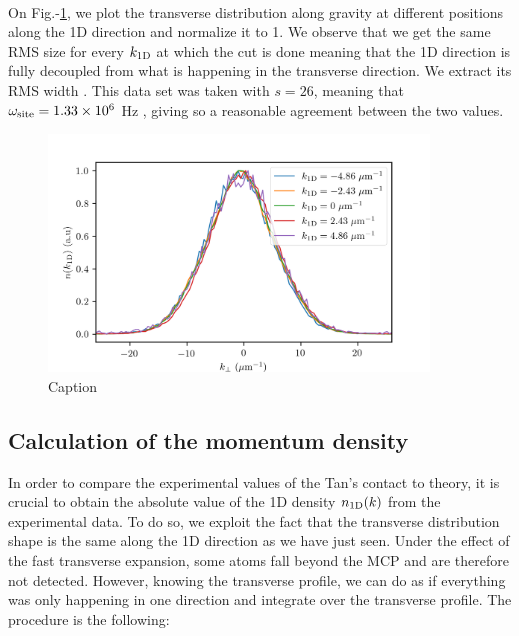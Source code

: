 \paragraph{} On Fig.-\ref{fig:1D_transverse}, we plot the transverse distribution along gravity at different positions along the 1D direction and normalize it to 1. We observe that we get the same RMS size for every $k_{\rm{1D}}$ at which the cut is done meaning that the 1D direction is fully decoupled from what is happening in the transverse direction. We extract its RMS width . This data set was taken with $s=26$, meaning that $\omega_{\rm{site}}=1.33 \times 10^6$ Hz , giving  so a reasonable agreement between the two values. 

\begin{figure}
    \centering
    \includegraphics[width=0.9\textwidth]{Fig/Chapter5/1D_transverse_effect.png}
    \caption{Caption}
    \label{fig:1D_transverse}
\end{figure}

\subsection{Calculation of the momentum density}


\label{sec:1D_calculation_momentum_density}

In order to compare the experimental values of the Tan's contact to theory, it is crucial to obtain the absolute value of the 1D density $n_{\rm{1D}}(k)$ from the experimental data. To do so, we exploit the fact that the transverse distribution shape is the same along the 1D direction as we have just seen. Under the effect of the fast transverse expansion, some atoms fall beyond the MCP and are therefore not detected. However, knowing the transverse profile, we can do as if everything was only happening in one direction and integrate over the transverse profile. The procedure is the following:

